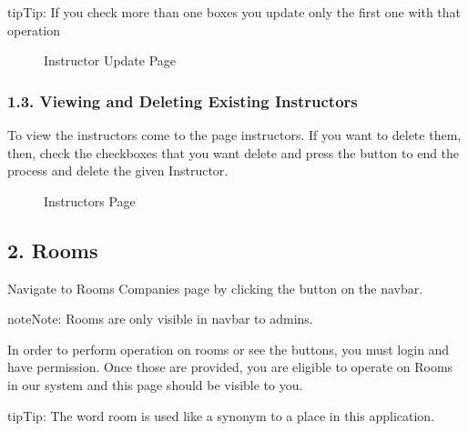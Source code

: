 \documentclass[letterpaper,10pt,english]{sphinxmanual}
\begin{document}
\begin{sphinxadmonition}{tip}{Tip:}
If you check more than one boxes you update only the first one with that operation
\end{sphinxadmonition}

\begin{figure}[htbp]
\centering
\capstart

\noindent{}
\caption{Instructor Update Page}\label{\detokenize{user/berkay:id2}}\end{figure}


\subsubsection{1.3. Viewing and Deleting Existing Instructors}
\label{\detokenize{user/berkay:viewing-and-deleting-existing-instructors}}
To view the instructors come to the page instructors. If you want to delete them,
then, check the checkboxes that you want delete and press the  button to
end the process and delete the given Instructor.

\begin{figure}[htbp]
\centering
\capstart

\noindent{}
\caption{Instructors Page}\label{\detokenize{user/berkay:id3}}\end{figure}


\subsection{2. Rooms}
\label{\detokenize{user/berkay:rooms}}
Navigate to Rooms Companies page by clicking the  button on the navbar.

\begin{sphinxadmonition}{note}{Note:}
Rooms are only visible in navbar to admins.
\end{sphinxadmonition}

In order to perform operation on rooms or see the buttons, you must login and have permission.
Once those are provided, you are eligible to operate on Rooms in our system and this page should be
visible to you.

\begin{sphinxadmonition}{tip}{Tip:}
The word room is used like a synonym to a place in this application.
\end{sphinxadmonition}
\end{document}
